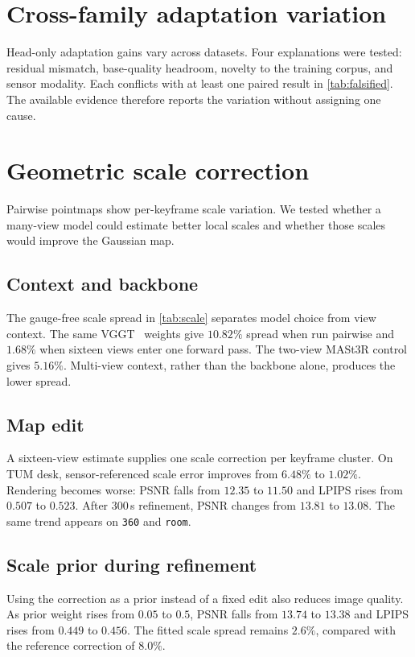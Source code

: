 \section{Cross-family adaptation variation}
\label{sec:neg:attrib}

Head-only adaptation gains vary across datasets. Four explanations were
tested: residual mismatch, base-quality headroom, novelty to the training
corpus, and sensor modality. Each conflicts with at least one paired result
in \cref{tab:falsified}. The available evidence therefore reports the
variation without assigning one cause.

\section{Geometric scale correction}
\label{sec:neg:frontend}

Pairwise pointmaps show per-keyframe scale variation. We tested whether a
many-view model could estimate better local scales and whether those scales
would improve the Gaussian map.

\subsection{Context and backbone}
The gauge-free scale spread in \cref{tab:scale} separates model choice from
view context. The same VGGT~\cite{wang2025vggt} weights give $10.82\%$ spread
when run pairwise and $1.68\%$ when sixteen views enter one forward pass.
The two-view MASt3R control gives $5.16\%$. Multi-view context, rather than
the backbone alone, produces the lower spread.



\subsection{Map edit}
A sixteen-view estimate supplies one scale correction per keyframe cluster.
On TUM desk, sensor-referenced scale error improves from $6.48\%$ to
$1.02\%$. Rendering becomes worse: PSNR falls from $12.35$ to
$11.50$\dB{} and LPIPS rises from $0.507$ to $0.523$.
After $300$\,s refinement, PSNR changes from $13.81$ to $13.08$\dB{}.
The same trend appears on \texttt{360} and \texttt{room}.

\subsection{Scale prior during refinement}
Using the correction as a prior instead of a fixed edit also reduces image
quality. As prior weight rises from $0.05$ to $0.5$, PSNR falls from
$13.74$ to $13.38$\dB{} and LPIPS rises from $0.449$ to $0.456$.
The fitted scale spread remains $2.6\%$, compared with the reference
correction of $8.0\%$.

